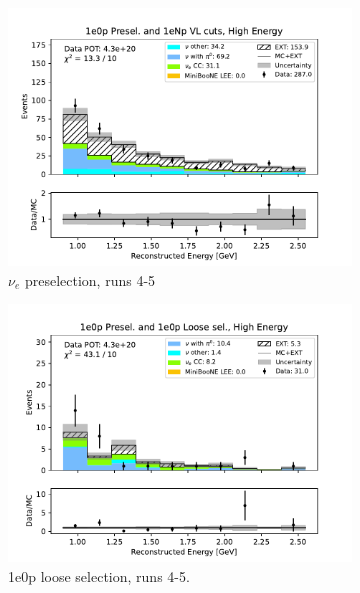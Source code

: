 \begin{figure}[H]
\begin{subfigure}{0.5\linewidth}
    \includegraphics[width=\linewidth]{technote/Sidebands/Figures/FarSideband/far_sideband_reco_e_run4b4c4d5_ZP_ZP_HIGH_ENERGY.pdf}
    \caption{$\nu_e$ preselection, runs 4-5}
    \end{subfigure}%
    \begin{subfigure}{0.5\linewidth}
    \includegraphics[width=\linewidth]{technote/Sidebands/Figures/FarSideband/far_sideband_reco_e_run4b4c4d5_ZP_ZPLOOSESEL_HIGH_ENERGY.pdf}
    \caption{1e0p loose selection, runs 4-5.}
    \end{subfigure}
    \begin{subfigure}{0.5\linewidth}

\end{subfigure}
\end{figure}
